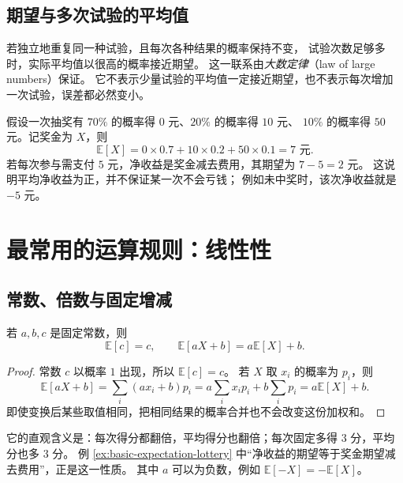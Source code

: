 \documentclass[UTF8,12pt,a4paper,fontset=fandol]{ctexart}
\begin{document}
\subsection{期望与多次试验的平均值}

若独立地重复同一种试验，且每次各种结果的概率保持不变，
试验次数足够多时，实际平均值以很高的概率接近期望。
这一联系由\emph{大数定律}（law of large numbers）保证。
它不表示少量试验的平均值一定接近期望，也不表示每次增加一次试验，误差都必然变小。

\begin{example}[奖金与净收益]
\label{ex:basic-expectation-lottery}
假设一次抽奖有 $70\%$ 的概率得 $0$ 元、$20\%$ 的概率得 $10$ 元、
$10\%$ 的概率得 $50$ 元。记奖金为 $X$，则
\[
  \mathbb E[X]=0\times0.7+10\times0.2+50\times0.1=7\text{ 元}.
\]
若每次参与需支付 $5$ 元，净收益是奖金减去费用，其期望为 $7-5=2$ 元。
这说明平均净收益为正，并不保证某一次不会亏钱；
例如未中奖时，该次净收益就是 $-5$ 元。
\end{example}

\section{最常用的运算规则：线性性}
\label{sec:basic-expectation-linearity}

\subsection{常数、倍数与固定增减}

\begin{property}[常数与一次式]
若 $a,b,c$ 是固定常数，则
\begin{equation}
  \mathbb E[c]=c,\qquad
  \mathbb E[aX+b]=a\mathbb E[X]+b.
  \label{eq:basic-expectation-affine}
\end{equation}
\end{property}

\begin{proof}
常数 $c$ 以概率 $1$ 出现，所以 $\mathbb E[c]=c$。
若 $X$ 取 $x_i$ 的概率为 $p_i$，则
\[
  \mathbb E[aX+b]
  =\sum_i(ax_i+b)p_i
  =a\sum_i x_ip_i+b\sum_i p_i
  =a\mathbb E[X]+b.
\]
即使变换后某些取值相同，把相同结果的概率合并也不会改变这份加权和。
\end{proof}

它的直观含义是：每次得分都翻倍，平均得分也翻倍；每次固定多得 $3$ 分，平均分也多 $3$ 分。
例 \ref{ex:basic-expectation-lottery} 中“净收益的期望等于奖金期望减去费用”，正是这一性质。
其中 $a$ 可以为负数，例如 $\mathbb E[-X]=-\mathbb E[X]$。
\end{document}
